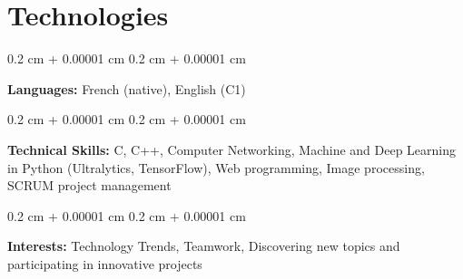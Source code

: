 \documentclass[10pt, letterpaper]{article}
\newenvironment{onecolentry}{
    \begin{adjustwidth}{
        0.2 cm + 0.00001 cm
    }{
        0.2 cm + 0.00001 cm
    }
}{
    \end{adjustwidth}
} %
\begin{document}
	
    \section{Technologies}
        \begin{onecolentry}
            \textbf{Languages:} French (native), English (C1)
        \end{onecolentry}

        \vspace{0.2 cm}

        \begin{onecolentry}
            \textbf{Technical Skills:} C, C++, Computer Networking, Machine and Deep Learning in Python (Ultralytics, TensorFlow), Web programming, Image processing, SCRUM project management
        \end{onecolentry}

		\vspace{0.2 cm}

        \begin{onecolentry}
            \textbf{Interests:} Technology Trends, Teamwork, Discovering new topics and participating in innovative projects
        \end{onecolentry}
\end{document}
